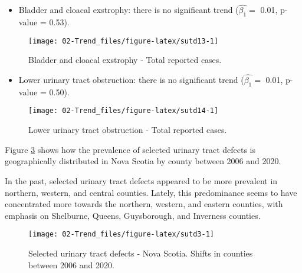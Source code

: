 \documentclass[
]{krantz}
\providecommand{\tightlist}{%
  \setlength{\itemsep}{0pt}\setlength{\parskip}{0pt}}
\begin{document}
\begin{itemize}
\tightlist
\item
  Bladder and cloacal exstrophy: there is no significant trend (\(\hat{\beta_{1}} =\) 0.01, p-value = 0.53).
\end{itemize}

\begin{figure}[h]

{\centering \texttt{[image: 02-Trend\_files/figure-latex/sutd13-1]} 

}

\caption{Bladder and cloacal exstrophy - Total reported cases.}\label{fig:sutd13}
\end{figure}

\begin{itemize}
\tightlist
\item
  Lower urinary tract obstruction: there is no significant trend (\(\hat{\beta_{1}} =\) 0.01, p-value = 0.50).
\end{itemize}

\begin{figure}[h]

{\centering \texttt{[image: 02-Trend\_files/figure-latex/sutd14-1]} 

}

\caption{Lower urinary tract obstruction - Total reported cases.}\label{fig:sutd14}
\end{figure}

Figure \ref{fig:sutd3} shows how the prevalence of selected urinary tract defects is geographically distributed in Nova Scotia by county between 2006 and 2020.

In the past, selected urinary tract defects appeared to be more prevalent in northern, western, and central counties. Lately, this predominance seems to have concentrated more towards the northern, western, and eastern counties, with emphasis on Shelburne, Queens, Guysborough, and Inverness counties.

\begin{figure}[h]

{\centering \texttt{[image: 02-Trend\_files/figure-latex/sutd3-1]} 

}

\caption{Selected urinary tract defects - Nova Scotia. Shifts in counties between 2006 and 2020.}\label{fig:sutd3}
\end{figure}

\clearpage
\end{document}
